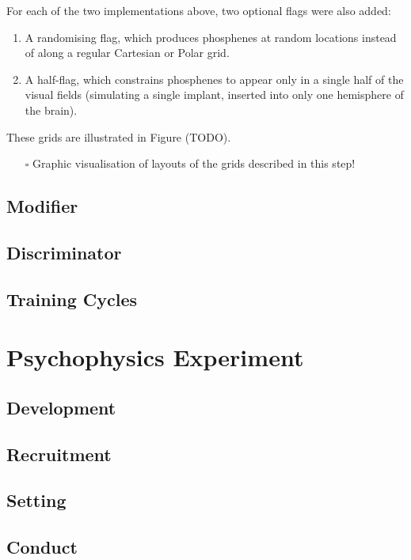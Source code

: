 \documentclass[11pt]{book}
\begin{document}
For each of the two implementations above, two optional flags were also added:
\begin{enumerate}
\item A randomising flag, which produces phosphenes at random locations instead of along a regular Cartesian or Polar grid.
\item A half-flag, which constrains phosphenes to appear only in a single half of the visual fields (simulating a single implant, inserted into only one hemisphere of the brain).
\end{enumerate}

These grids are illustrated in Figure (TODO).

\begin{itemize}
\item[{$\square$}] Graphic visualisation of layouts of the grids described in this step!
\end{itemize}

\section*{Modifier}
\label{sec:org674f96a}
\section*{Discriminator}
\label{sec:org8626dd4}
\section*{Training Cycles}
\label{sec:orge7eca6f}

\chapter{Psychophysics Experiment}
\label{sec:org5606157}
\section*{Development}
\label{sec:orgc01aa4c}
\section*{Recruitment}
\label{sec:orgd15dd4b}
\section*{Setting}
\label{sec:org413193f}
\section*{Conduct}
\label{sec:org5c2b0a3}
\end{document}
